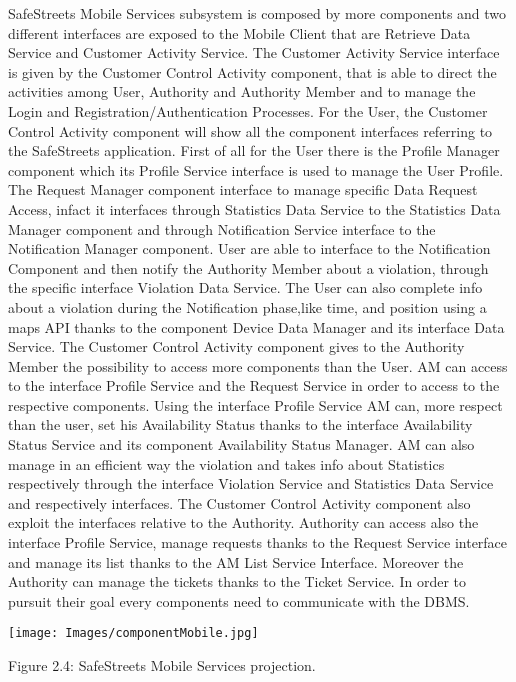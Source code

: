 \documentclass[12pt]{article}
\begin{document}
SafeStreets Mobile Services subsystem is composed by more components and two different interfaces are exposed to the Mobile Client that are Retrieve Data Service and Customer Activity Service. The Customer Activity Service interface is given by the  Customer Control Activity component, that is able to direct the activities among User, Authority and Authority Member and to manage the Login and Registration/Authentication Processes. For the User, the Customer Control Activity component will show all the component interfaces referring to the SafeStreets application. First of all for the User there is the Profile Manager component which its Profile Service interface is used to manage the User Profile. The Request Manager component interface to manage specific Data Request Access, infact it interfaces through Statistics Data Service to the Statistics Data Manager component and through Notification Service interface to the Notification Manager component. User are able to interface to the Notification Component and then notify the Authority Member about a violation, through the specific interface Violation Data Service. The User can also complete  info about a violation during the Notification phase,like time, and position using a maps API thanks to the component Device Data Manager and its interface Data Service. The Customer Control Activity component gives to the Authority Member the possibility to access more components than the User. AM can access to the interface Profile Service and the Request Service in order to access to the respective components. Using the interface Profile Service AM can, more respect than the user, set his Availability Status thanks to the interface Availability Status Service and its component Availability Status Manager. AM can also manage in an efficient way the violation and takes info about Statistics respectively through the interface Violation Service and Statistics Data Service and respectively interfaces.
The Customer Control Activity component also exploit the interfaces relative to the Authority. Authority can access also the interface Profile Service, manage requests thanks to the Request Service interface and manage its list thanks to the AM List Service Interface. Moreover the Authority can manage the tickets thanks to the Ticket Service.
In order to pursuit their goal every components need to communicate with the DBMS.


\begin{center}
\texttt{[image: Images/componentMobile.jpg]}

\vspace{2mm}
Figure 2.4: SafeStreets Mobile Services projection.
\end{center}
\end{document}
